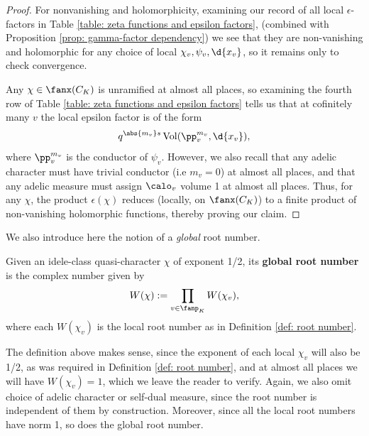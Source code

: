 \documentclass[11pt, x11names, openany]{book}
\begin{document}
\begin{proof}
    For nonvanishing and holomorphicity, examining our record of all local $\epsilon$-factors in Table \ref{table: zeta functions and epsilon factors}, (combined with Proposition \ref{prop: gamma-factor dependency}) we see that they are non-vanishing and holomorphic for any choice of local $\chi_v, \psi_v, \d{x_v}$, so it remains only to check convergence.

    Any $\chi \in \fanx(C_K)$ is unramified at almost all places, so examining the fourth row of Table \ref{table: zeta functions and epsilon factors} tells us that at cofinitely many $v$ the local epsilon factor is of the form
    \begin{equation*}
        q^{\abs{m_v} s} \vol(\pp_v^{m_v}, \d{x_v}),
    \end{equation*}
    where $\pp_v^{m_v}$ is the conductor of $\psi_v$. However, we also recall  that any adelic character must have trivial conductor (i.e $m_v = 0$) at almost all places, and that any adelic measure must assign $\calo_v$ volume 1 at almost all places. Thus, for any $\chi$, the product $\epsilon(\chi)$ reduces (locally, on $\fanx(C_K)$) to a finite product of non-vanishing holomorphic functions, thereby proving our claim. 
\end{proof}

We also introduce here the notion of a \textit{global} root number.

\begin{defn}
\label{def: global root number}
Given an idele-class quasi-character $\chi$ of exponent 1/2, its \textbf{global root number} is the complex number given by
\begin{equation*}
    W(\chi) := \prod_{v \in \fanp_K} W(\chi_v),
\end{equation*}
where each $W(\chi_v)$ is the local root number as in Definition \ref{def: root number}.
\end{defn}

\begin{sanitycheck}
The definition above makes sense, since the exponent of each local $\chi_v$ will also be 1/2, as was required in Definition \ref{def: root number}, and at almost all places we will have $W(\chi_v) = 1$, which we leave the reader to verify. Again, we also omit choice of adelic character or self-dual measure, since the root number is independent of them by construction. Moreover, since all the local root numbers have norm 1, so does the global root number.
\end{sanitycheck}
\end{document}
